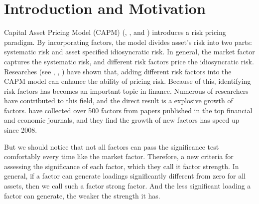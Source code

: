 


\section{Introduction and Motivation}
Capital Asset Pricing Model (CAPM) (, , and ) introduces a risk pricing paradigm.
By incorporating factors, the model divides asset's risk into two parts: systematic risk and asset specified idiosyncratic risk.
In general, the market factor captures the systematic risk, and different risk factors price the idiosyncratic risk.
Researches (see , , ) have shown that, adding different risk factors into the CAPM model can enhance the ability of pricing risk.
Because of this, identifying risk factors has becomes an important topic in finance.
Numerous of researchers have contributed to this field, and the direct result is a explosive growth of factors.
  have collected over 500 factors from papers published in the top financial and economic journals, and they find the growth of new factors has speed up since 2008. 

But we should notice that not all factors can pass the significance test comfortably every time like the market factor.
Therefore,  a new criteria for assessing the significance of each factor, which they call it factor strength.
In general, if a factor can generate loadings significantly different from zero for all assets, then we call such a factor strong factor.
And the less significant loading a factor can generate, the weaker the strength it has.

